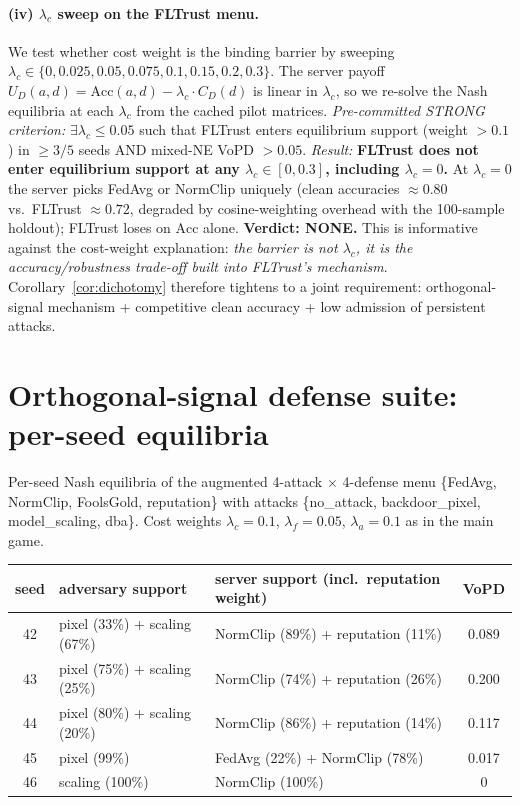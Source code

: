 \documentclass{article}
\begin{document}
\paragraph{(iv) $\lambda_c$ sweep on the FLTrust menu.} We test whether cost weight is the binding barrier by sweeping $\lambda_c \in \{0, 0.025, 0.05, 0.075, 0.1, 0.15, 0.2, 0.3\}$. The server payoff $U_D(a, d) = \mathrm{Acc}(a,d) - \lambda_c \cdot C_D(d)$ is linear in $\lambda_c$, so we re-solve the Nash equilibria at each $\lambda_c$ from the cached pilot matrices. \emph{Pre-committed STRONG criterion:} $\exists \lambda_c \leq 0.05$ such that FLTrust enters equilibrium support (weight $> 0.1$) in $\geq 3/5$ seeds AND mixed-NE VoPD $> 0.05$. \emph{Result:} \textbf{FLTrust does not enter equilibrium support at any $\lambda_c \in [0, 0.3]$, including $\lambda_c=0$.} At $\lambda_c=0$ the server picks FedAvg or NormClip uniquely (clean accuracies ${\approx}0.80$ vs.\ FLTrust ${\approx}0.72$, degraded by cosine-weighting overhead with the 100-sample holdout); FLTrust loses on $\mathrm{Acc}$ alone. \textbf{Verdict: NONE.} This is informative against the cost-weight explanation: \emph{the barrier is not $\lambda_c$, it is the accuracy/robustness trade-off built into FLTrust's mechanism}. Corollary~\ref{cor:dichotomy} therefore tightens to a joint requirement: orthogonal-signal mechanism + competitive clean accuracy + low admission of persistent attacks.



\section{Orthogonal-signal defense suite: per-seed equilibria}
\label{app:orthogonal_suite_details}

Per-seed Nash equilibria of the augmented 4-attack $\times$ 4-defense menu \{FedAvg, NormClip, FoolsGold, reputation\} with attacks \{no\_attack, backdoor\_pixel, model\_scaling, dba\}. Cost weights $\lambda_c=0.1$, $\lambda_f=0.05$, $\lambda_a=0.1$ as in the main game.

\begin{center}\small
\begin{tabular}{c|l|l|c}
\toprule
seed & adversary support & server support (incl.\ reputation weight) & VoPD \\
\midrule
42 & pixel (33\%) + scaling (67\%) & NormClip (89\%) + reputation (11\%) & 0.089 \\
43 & pixel (75\%) + scaling (25\%) & NormClip (74\%) + reputation (26\%) & 0.200 \\
44 & pixel (80\%) + scaling (20\%) & NormClip (86\%) + reputation (14\%) & 0.117 \\
45 & pixel (99\%) & FedAvg (22\%) + NormClip (78\%) & 0.017 \\
46 & scaling (100\%) & NormClip (100\%) & 0 \\
\bottomrule
\end{tabular}
\end{center}
\end{document}
